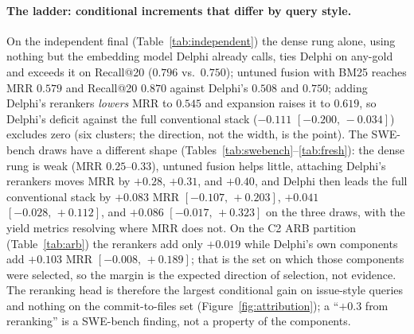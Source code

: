 \documentclass{article}
\newcommand{\ci}[2]{{\footnotesize$[#1,\,#2]$}}
\newcommand{\system}{Delphi}
\begin{document}
\paragraph{The ladder: conditional increments that differ by query style.} On the independent final (Table~\ref{tab:independent}) the dense rung alone, using nothing but the embedding model \system{} already calls, ties \system{} on any-gold and exceeds it on Recall@20 ($0.796$ vs.\ $0.750$); untuned fusion with BM25 reaches MRR $0.579$ and Recall@20 $0.870$ against \system{}'s $0.508$ and $0.750$; adding \system{}'s rerankers \emph{lowers} MRR to $0.545$ and expansion raises it to $0.619$, so \system{}'s deficit against the full conventional stack ($-0.111$ \ci{-0.200}{-0.034}) excludes zero (six clusters; the direction, not the width, is the point). The SWE-bench draws have a different shape (Tables~\ref{tab:swebench}--\ref{tab:fresh}): the dense rung is weak (MRR $0.25$--$0.33$), untuned fusion helps little, attaching \system{}'s rerankers moves MRR by $+0.28$, $+0.31$, and $+0.40$, and \system{} then leads the full conventional stack by $+0.083$ MRR \ci{-0.107}{+0.203}, $+0.041$ \ci{-0.028}{+0.112}, and $+0.086$ \ci{-0.017}{+0.323} on the three draws, with the yield metrics resolving where MRR does not. On the C2 ARB partition (Table~\ref{tab:arb}) the rerankers add only $+0.019$ while \system{}'s own components add $+0.103$ MRR \ci{-0.008}{+0.189}; that is the set on which those components were selected, so the margin is the expected direction of selection, not evidence. The reranking head is therefore the largest conditional gain on issue-style queries and nothing on the commit-to-files set (Figure~\ref{fig:attribution}); a ``$+0.3$ from reranking'' is a SWE-bench finding, not a property of the components.
\end{document}
